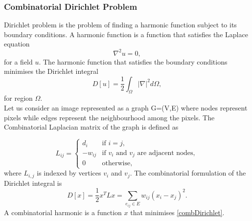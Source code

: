 \documentclass[10pt,a4paper]{article}
\begin{document}
\subsubsection {Combinatorial Dirichlet Problem}
Dirichlet problem is the problem of finding a harmonic function subject to its boundary conditions. A harmonic function is a function that satisfies the Laplace equation
\begin{equation}
\nabla^2 u = 0,
\end{equation}
for a field $u$. The harmonic function that satisfies the boundary conditions minimises the Dirichlet integral
\begin{equation}
D[u]= \frac{1}{2} \int_{\Omega} |\nabla|^2 d\Omega,
\end{equation}
for region $\Omega$.\\
Let us consider an image represented as a graph G=(V,E) where nodes represent pixels while edges represent the neighbourhood among the pixels. The Combinatorial Laplacian matrix of the graph is defined as

\begin{equation}
L_{ij} = \begin{cases}
d_i & \text{if } i=j, \\
-w_{ij} & \text{if } v_i \text{ and } v_j \text{ are adjacent nodes},\\
0 & \text{otherwise,}
\end{cases}
\end{equation}
where $L_{i,j}$ is indexed by vertices $v_i$ and $v_j$.
The combinatorial formulation of the Dirichlet integral is 
\begin{equation}
D[x] = \frac{1}{2} x^T L x = \sum_{e_{ij} \in E} w_{ij} (x_i -x_j)^2.
\label{combDirichlet}
\end{equation}
A combinatorial harmonic is a function $x$ that minimises \ref{combDirichlet}.
\end{document}
